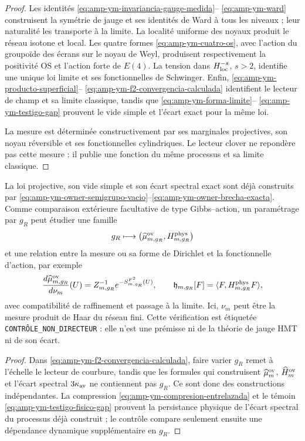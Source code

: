 \begin{proof}
Les identités \eqref{eq:amp-ym-invariancia-gauge-medida}--
\eqref{eq:amp-ym-ward} construisent la symétrie de jauge et ses identités de
Ward à tous les niveaux ; leur naturalité les transporte à la limite.  La
localité uniforme des noyaux produit le réseau isotone et local.  Les
quatre formes \eqref{eq:amp-ym-cuatro-os}, avec l’action du groupoïde
des écrans sur le noyau de Weyl, produisent respectivement la positivité
OS et l’action forte de \(E(4)\).  La tension dans
\(H^{-s}_{\rm loc}\), \(s>2\), identifie une unique loi limite et ses
fonctionnelles de Schwinger.  Enfin,
\eqref{eq:amp-ym-producto-superficial}--
\eqref{eq:amp-ym-f2-convergencia-calculada} identifient le lecteur de champ
et sa limite classique, tandis que
\eqref{eq:amp-ym-forma-limite}--
\eqref{eq:amp-ym-testigo-gap} prouvent le vide simple et l’écart exact pour la
même loi.

La mesure est déterminée constructivement par ses marginales projectives, son noyau réversible et ses fonctionnelles cylindriques. Le lecteur clover ne repondère pas cette mesure : il publie une fonction du même processus et sa limite classique.
\end{proof}

\begin{proposition}
\label{prop:amp-ym-puente-accion-requerido}
La loi projective, son vide simple et son écart spectral exact sont déjà construits par \eqref{eq:amp-ym-owner-semigrupo-vacio}--\eqref{eq:amp-ym-owner-brecha-exacta}. Comme comparaison extérieure facultative de type Gibbs--action, un paramétrage par \(g_R\) peut étudier une famille
\[
 g_R\longmapsto
 \bigl(\widehat\mu_{m,g_R}^{\rm ov},H_{m,g_R}^{\rm phys}\bigr)
\]
et une relation entre la mesure ou sa forme de Dirichlet et la fonctionnelle
d’action, par exemple
\begin{equation}\label{eq:amp-ym-identidad-accion-requerida}
 \frac{d\widehat\mu_{m,g_R}^{\rm ov}}{d\nu_m}(U)
 =Z_{m,g_R}^{-1}e^{-S_{m,g_R}^{F^2}(U)},
 \qquad
 \mathfrak h_{m,g_R}[F]
 =\langle F,H_{m,g_R}^{\rm phys}F\rangle,
\end{equation}
avec compatibilité de raffinement et passage à la limite. Ici, \(\nu_m\) peut
être la mesure produit de Haar du réseau fini. Cette vérification est étiquetée
\texttt{CONTRÔLE\_NON\_DIRECTEUR} : elle n’est une prémisse ni de la théorie de jauge HMT ni
de son écart.
\end{proposition}

\begin{proof}
Dans \eqref{eq:amp-ym-f2-convergencia-calculada}, faire varier \(g_R\) remet à l'échelle le lecteur de courbure, tandis que les formules qui construisent \(\widehat\mu_m^{\rm ov}\), \(\widehat H_m^{\rm ov}\) et l'écart spectral \(3\kappa_{\rm av}\) ne contiennent pas \(g_R\). Ce sont donc des constructions indépendantes. La compression \eqref{eq:amp-ym-compresion-entrelazada} et le témoin \eqref{eq:amp-ym-testigo-fisico-gap} prouvent la persistance physique de l'écart spectral du processus déjà construit ; le contrôle compare seulement ensuite une dépendance dynamique supplémentaire en \(g_R\).
\end{proof}

